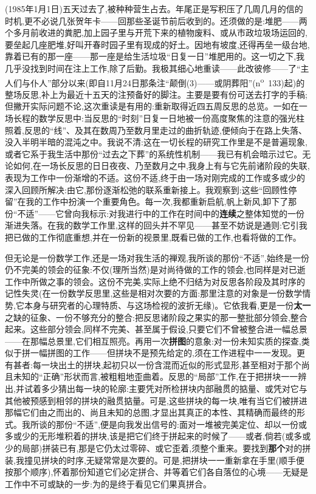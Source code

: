 (1985年1月1日)五天过去了,被种种营生占去。年尾正是写积压了几周几月的信的时机,更不必说几张贺年卡——回那些圣诞节前后收到的。还须做的是:堆肥——两个多月前收进的粪肥,加上园子里与开荒下来的植物废料、或从市政垃圾场运回的,要垒起几座肥堆,好叫开春时园子里有现成的好土。因地有坡度,还得再垒一级台地,靠着已有的那一座——那一座是给生活垃圾“日复一日”堆肥用的。这一切之下,我几乎没找到时间在注上工作,除了后勤。我极其细心地重读——此改彼修——了“主人们与仆人”部分以来(即自11月24日那条注“颠倒(3)——或阴葬阳”(n\textsuperscript{o}~133)起)的整场反思,补上为最近十五天的注预备好的脚注。主要是要有份可送去打字的手稿;但撇开实际问题不论,这次重读是有用的:重新取得近四五周反思的总览。一如在一场长程的数学反思中:当反思的“时刻”日复一日地被一份高度聚焦的注意的强光柱照着,反思的“线”、及其在数周乃至数月里走过的曲折轨迹,便倾向于在路上失落、没入半明半暗的混沌之中。我说不清:这在一切长程\dmark{}的研究工作里是不是普遍现象,或者它系于我生活中那份“过去之下葬”的系统性机制——我已有机会暗示过它。无论如何,在一场长反思的日日夜夜、乃至数月之中,我身上有与它先前诸阶段的失联,表现为工作中一份渐增的不适。这份不适,终于由一场对刚完成的工作或多或少的深入回顾所解决:由它,那份逐渐松弛的联系重新接上。我观察到:这些“回顾性停留”在我的工作中扮演一个重要角色。每一次,我都重新启航,帆上新风,卸下了那份“不适”——它曾向我标示:对我进行中的工作在时间中的\textbf{连续}之整体知觉的一份渐进失落。在我的数学工作里,这样的回头并不罕见——甚至不妨说是通则:它引我把已做的工作彻底重想,并在一份新的视景里,既看已做的工作,也看将做的工作。

但无论是一份数学工作,还是一场对我生活的禅观,我所谈的那份“不适”,始终是一份仍不完美的领会的征象:不仅(理所当然)是对尚待做的工作的领会,也同样是对已逝工作中所做之事的领会。这份不完美,实际上绝不归结为对反思各阶段及其时序的记性失灵(在一份数学反思里,这些是相对次要的方面:那里注意的对象是一份数学情势,它本身与研究者的心理特质、与这场检视的波折无缘)。它依我看,更是一份\textbf{太一}之缺的征象、一份不够充分的整合:把反思诸阶段之果实的那一整批部分领会,整合起来。这些部分领会,同样不完美、甚至属于假设,只要它们不曾被整合进一幅总景——在那幅总景里,它们相互照亮\dmark{}。再用一次\textbf{拼图}的意象:对一份未知实质的探查,类似于拼一幅拼图的工作——但拼块不是预先给定的,须在工作进程中一一发现。更有甚者:每一块出土的拼块,起初只以一份含混而近似的形式显形,甚至相对于那个尚且未知的“正确”形状而言,被粗粗地歪曲着。反思的“局部”工作,在于把拼块一一辨出,并试着多少猜出每一块的轮廓:主要凭对所检拼块内部融贯的掂量、或凭对它与其他被预感到相邻的拼块的融贯掂量。可是,这些拼块的每一块,唯有当它们被拼进那幅它们由之而出的、尚且未知的总图,才显出其真正的本性、其精确而最终的形式。我所谈的那份“不适”,便是向我发出信号的:面对一堆被完美定位、却以一份或多或少的无形堆积着的拼块,该是把它们终于拼起来的时候了——或者,倘若(或多或少的局部)拼装已有,那是它仍太过零碎、或它歪着,须整个重来。要找到\textbf{那个}对的拼装,我撞见拼块的时序,无疑常常是次要的。可是,把拼块一一重新拿在手里(顺手便按那个顺序),怀着那份知道它们必定拼合、并等着它们各自落位的心境——无疑是工作中不可或缺的一步:为的是终于看见它们果真拼合。


